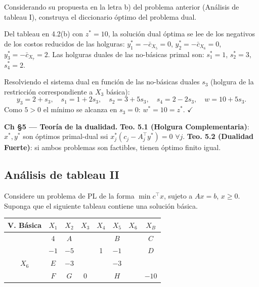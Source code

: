 \documentclass[12pt]{article}
\theoremstyle{plain}
\begin{document}
Considerando su propuesta en la letra b) del problema anterior (Análisis de tableau I),
construya el diccionario óptimo del problema dual.

\begin{solucion}

Del tableau en 4.2(b) con $z^*=10$, la solución dual óptima se lee de los negativos de los costos reducidos de las holguras: $y_1^*=-\bar{c}_{X_5}=0$, $y_2^*=-\bar{c}_{X_6}=0$, $y_3^*=-\bar{c}_{X_7}=2$. Las holguras duales de las no-básicas primal son: $s_1^*=1$, $s_2^*=3$, $s_4^*=2$.

Resolviendo el sistema dual en función de las no-básicas duales $s_3$ (holgura de la restricción correspondiente a $X_3$ básica):
\[
y_3=2+s_3,\quad s_1=1+2s_3,\quad s_2=3+5s_3,\quad s_4=2-2s_3,\quad w=10+5s_3.
\]
Como $5>0$ el mínimo se alcanza en $s_3=0$: $w^*=10=z^*$. $\checkmark$

\end{solucion}

\begin{teofund}
\textbf{Ch §5 — Teoría de la dualidad.} \textbf{Teo. 5.1 (Holgura Complementaria)}: $x^*,y^*$ son óptimos primal-dual ssi $x^*_j(c_j-A_j^\top y^*)=0$ $\forall j$. \textbf{Teo. 5.2 (Dualidad Fuerte)}: si ambos problemas son factibles, tienen óptimo finito igual.
\end{teofund}

\bigskip

\subsection{Análisis de tableau II}

Considere un problema de PL de la forma $\min c^\top x$, sujeto a $Ax = b$, $x \geq 0$.
Suponga que el siguiente tableau contiene una solución básica.

\begin{center}
      \begin{tabular}{c|cccccc|c}
            V. Básica & $X_1$ & $X_2$ & $X_3$ & $X_4$ & $X_5$ & $X_6$ & $X_B$ \\
            \hline
                      & 4     & $A$   &       &       & $B$   &       & $C$   \\
                      & $-1$  & $-5$  &       & 1     & $-1$  &       & $D$   \\
            $X_6$     & $E$   & $-3$  &       &       & $-3$  &       &       \\
                      & $F$   & $G$   & 0     &       & $H$   &       & $-10$ \\
      \end{tabular}
\end{center}
\end{document}
